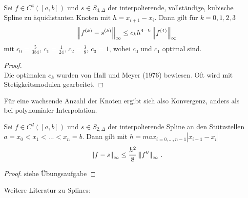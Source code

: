                 \begin{Satze}\label{5.2.21}
                  Sei $f\in C^4([a,b])$ und $s\in S_{4,\Delta}$ 
                  der interpolierende, vollständige, kubische Spline 
                  zu äquidistanten Knoten mit $h=x_{i+1}-x_i$. Dann gilt
                  für $k=0,1,2,3$
                  \begin{gather*}
                    \nn[f^{(k)}-s^{(k)}]_{\infty}\leq c_kh^{4-k}\nn[f^{(4)}]_{\infty}
                  \end{gather*}
                  mit $c_0=\frac{5}{384}$, $c_1=\frac{1}{24}$, $c_2=\frac{3}{8}$,
                  $c_3=1$, wobei $c_0$ und $c_1$ optimal sind.

                  \begin{proof}
                    \cite[siehe z.B.]
                    [(in allgemeiner Form, d.h. auch für nicht gleichmäßiges Gitter)]
                    {stoerbulirsch}\\
                    Die optimalen $c_k$ wurden von Hall und Meyer (1976) bewiesen.
                    Oft wird mit Stetigkeitsmodulen gearbeitet.
                  \end{proof}
                \end{Satze}


                Für eine wachsende Anzahl der Knoten ergibt sich also Konvergenz,
                anders als bei polynomialer Interpolation.


                \begin{Satze}\label{6.2.22}
                  Sei $f\in C^2([a,b])$ und $s\in S_{2,\Delta}$
                  der interpolierende Spline  an den Stützstellen 
                  $a=x_0<x_1<\ldots<x_n=b$. 
                  Dann gilt mit $h=max_{i=0,\ldots,n-1}|x_{i+1}-x_i|$
                  \begin{gather*}
                    \nn[f-s]_{\infty}\leq \frac{h^2}{8}\nn[f'']_{\infty} \, .
                  \end{gather*}

                  \begin{proof} 
                    siehe Übungsaufgabe
                  \end{proof}
                \end{Satze}


                Weitere Literatur zu
                Splines: \cite{boor}

